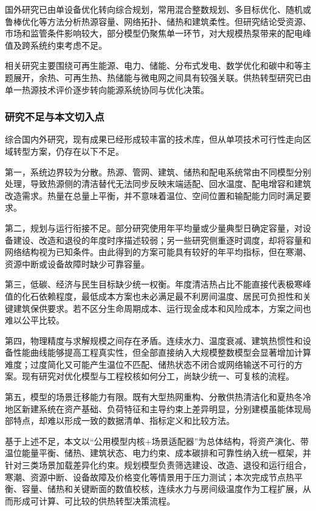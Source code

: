 \documentclass[12pt,a4paper]{article}
\begin{document}
国外研究已由单设备优化转向综合规划，常用混合整数规划、多目标优化、随机或鲁棒优化等方法分析热源容量、网络拓扑、储热和建筑柔性。但研究结论受资源、市场和监管条件影响较大，部分模型仍聚焦单一环节，对大规模热泵带来的配电峰值及跨系统约束考虑不足。

相关研究主要围绕可再生能源、电力、储能、分布式发电、数学优化和碳中和等主题展开，余热、可再生热、热储能与微电网之间具有较强关联。供热转型研究已由单一热源技术评价逐步转向能源系统协同与优化决策。

\subsubsection{研究不足与本文切入点}

综合国内外研究，现有成果已经形成较丰富的技术库，但从单项技术可行性走向区域转型方案，仍存在以下不足。

第一，系统边界较为分散。热源、管网、建筑、储热和配电系统常由不同模型分别处理，导致热源侧的清洁替代无法同步反映末端适配、回水温度、配电增容和建筑改造需求。热量在总量上平衡，并不意味着温位、空间位置和输配能力同时满足要求。

第二，规划与运行衔接不足。部分研究使用年平均量或少量典型日确定容量，对设备建设、改造和退役的年度时序描述较弱；另一些研究侧重逐时调度，却将容量和网络结构视为已知条件。由此得到的方案可能具有较好的年平均指标，但在寒潮、资源中断或设备故障时缺少可靠容量。

第三，低碳、经济与民生目标缺少统一权衡。年度清洁热占比不能直接代表极寒峰值的化石依赖程度，最低成本方案也未必满足最不利房间温度、居民可负担性和关键建筑保供要求。若不区分生命周期成本、运行现金成本和风险成本，方案之间也难以公平比较。

第四，物理精度与求解规模之间存在矛盾。连续水力、温度衰减、建筑热惯性和设备性能曲线能够提高工程真实性，但全部直接纳入大规模整数模型会显著增加计算难度；过度简化又可能产生温位不匹配、储热状态不闭合或网络输送不可行的方案。现有研究对优化模型与工程校核如何分工，尚缺少统一、可复核的流程。

第五，模型的场景迁移能力有限。既有大型热网重构、分散供热清洁化和夏热冬冷地区新建系统在资产基础、负荷特征和主导约束上差异明显，分别建模虽能体现局部特点，却难以形成一致的数据清单、指标定义和比较方法。

基于上述不足，本文以“公用模型内核+场景适配器”为总体结构，将资产演化、带温位能量平衡、储热、建筑状态、电力约束、成本碳排和可靠性纳入统一框架，并针对三类场景加载差异化约束。规划模型负责筛选建设、改造、退役和运行组合，寒潮、资源中断、设备故障及价格变化等情景用于压力测试；本次完成节点热平衡、容量、储热和关键断面的数值校核，连续水力与房间级温度作为工程扩展，从而形成可计算、可比较的供热转型决策流程。
\end{document}
